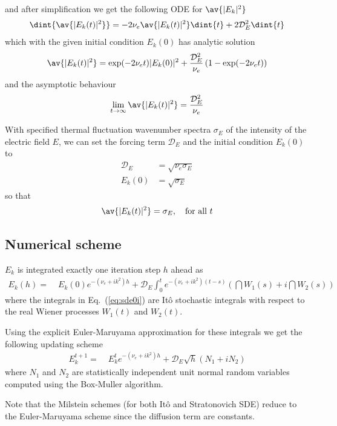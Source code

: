 \documentclass[10pt,a4paper]{article}
\newcommand{\eq}[1]{Eq.~(#1)}
\newcommand{\src}{\ensuremath{\mathcal{D}}}
\begin{document}
and after simplification we get the following ODE for $\av{|E_k|^2}$
\begin{align}
\dint{\av{|E_k(t)|^2}} = -2\nu_e\av{|E_k(t)|^2}\dint{t}+2\src_E^2\dint{t}
\end{align}
which with the given initial condition $E_k(0)$ has analytic solution
\begin{align}
\av{|E_k(t)|^2} = \exp(-2\nu_et)|E_k(0)|^2+\frac{\src_E^2}{\nu_e}
\left(1-\exp(-2\nu_et)\right)
\label{eq:sde0a}
\end{align}
and the asymptotic behaviour
\begin{align}
\lim_{t\rightarrow\infty}\av{|E_k(t)|^2} = \frac{\src_E^2}{\nu_e}
\end{align}

With specified thermal fluctuation wavenumber spectra $\sigma_E$ of the intensity
of the electric field $E$, we can set the forcing term $\src_E$  and the initial condition
$E_k(0)$ to
\begin{align}
\src_E&=\sqrt{\nu_e\sigma_E}\\
E_k(0)&=\sqrt{\sigma_E}
\end{align}
so that 
\begin{align}
\av{|E_k(t)|^2} = \sigma_E, \quad \mbox{for all } t
\end{align}


\subsection{Numerical scheme}


$E_k$ is integrated exactly one iteration step $h$ ahead as
\begin{align}
E_k(h)=&\;E_k(0)e^{-(\nu_e{+}ik^2)h}+\src_E\int_0^t e^{-(\nu_e{+}ik^2)(t{-}s)}
\left(\dint{W_1(s)}+i\dint{W_2(s)}\right)\label{eq:sde0i}
\end{align}
where the integrals in \eq{\ref{eq:sde0i}} are It\^o stochastic integrals with
respect to the real Wiener processes $W_1(t)$ and $W_2(t)$. 

Using the explicit Euler-Maruyama approximation \citep{higham:2001} for these integrals we get
the following updating scheme 
\begin{align}
E_k^{t+1}=&\;E_k^te^{-(\nu_e{+}ik^2)h}+\src_E\sqrt{h}
\left(N_1+iN_2\right)\label{eq:sde0num}
\end{align}
where $N_1$ and $N_2$ are statistically independent unit normal random variables computed using
the Box-Muller algorithm.

Note that the Milstein schemes (for both Itô and Stratonovich SDE) reduce to the Euler-Maruyama
scheme since the diffusion term are constants.
\end{document}
